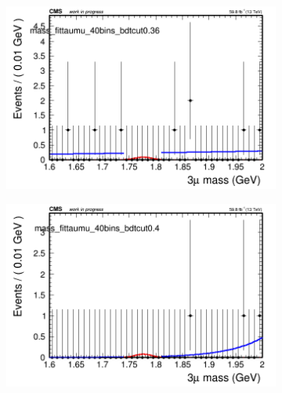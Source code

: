 \begin{figure}[H]
\begin{subfigure}{0.2\textwidth}
        \caption{}
    \end{subfigure}
    \begin{subfigure}{0.2\textwidth}
        \includegraphics[width=\textwidth]{unfixed_exp/plots/taumu/massfit_taumu_40bins_bdtcut0.36.png}
        \caption{}
    \end{subfigure}
    \begin{subfigure}{0.2\textwidth}
        \includegraphics[width=\textwidth]{unfixed_exp/plots/taumu/massfit_taumu_40bins_bdtcut0.4.png}
        \caption{}
    \end{subfigure}
    \begin{subfigure}{0.2\textwidth}

\end{subfigure}
\end{figure}
